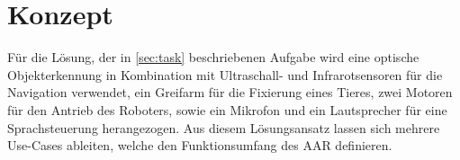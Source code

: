 \section{Konzept}

Für die Lösung, der in \autoref{sec:task} beschriebenen Aufgabe wird eine optische Objekterkennung in Kombination mit Ultraschall- und Infrarotsensoren für die Navigation verwendet, ein Greifarm für die Fixierung eines Tieres, zwei Motoren für den Antrieb des Roboters, sowie ein Mikrofon und ein Lautsprecher für eine Sprachsteuerung herangezogen.
Aus diesem Lösungsansatz lassen sich mehrere Use-Cases ableiten, welche den Funktionsumfang des \ac{AAR} definieren.
